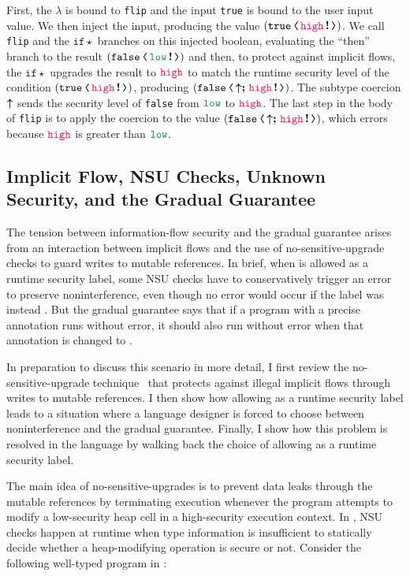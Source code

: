 First, the $\lambda$ is bound to \texttt{flip} and the input \texttt{true} is
bound to the user input value. We then inject the input, producing the
value $(\cccast{\true}{\inj{\high}})$. We call \texttt{flip} and the
$\mathtt{if}\star$ branches on this injected boolean, evaluating the ``then''
branch to the result $(\cccast{\false}{\inj{\low}})$ and then, to protect
against implicit flows, the $\mathtt{if}\star$ upgrades the result to $\high$ to
match the runtime security level of the condition
$(\cccast{\true}{\inj{\high}})$, producing
$(\cccast{\false}{\up\seq\inj{\high}})$. The subtype coercion $\boldsymbol{\uparrow}$ sends
the security level of \texttt{false} from $\low$ to $\high$. The last step in
the body of \texttt{flip} is to apply the coercion \texttt{} to
the value $(\cccast{\false}{\up\seq\inj{\high}})$, which errors because
$\high$ is greater than $\low$.

\subsection{Implicit Flow, NSU Checks, Unknown Security, and the Gradual Guarantee}
\label{sec:example2}


The tension between information-flow security and the gradual guarantee arises
from an interaction between implicit flows and the use of no-sensitive-upgrade
checks to guard writes to mutable references. In brief, when \unk is allowed as
a runtime security label, some NSU checks have to conservatively trigger an
error to preserve noninterference, even though no error would occur if the label
was instead \high. But the gradual guarantee says that if a program with a
precise annotation runs without error, it should also run without error when
that annotation is changed to \unk.

In preparation to discuss this scenario in more detail, I first review the
no-sensitive-upgrade technique~\parencite{austin2009efficient} that protects against
illegal implicit flows through writes to mutable references. I then show how
allowing \unk as a runtime security label leads to a situation where a language
designer is forced to choose between noninterference and the gradual guarantee.
Finally, I show how this problem is resolved in the \Surface language by walking
back the choice of allowing \unk as a runtime security label.

The main idea of no-sensitive-upgrades is to prevent data leaks through the
mutable references by terminating execution whenever the program attempts to
modify a low-security heap cell in a high-security execution context. In
\Surface, NSU checks happen at runtime when type information is insufficient to
statically decide whether a heap-modifying operation is secure or not. Consider
the following well-typed program in \Surface:

